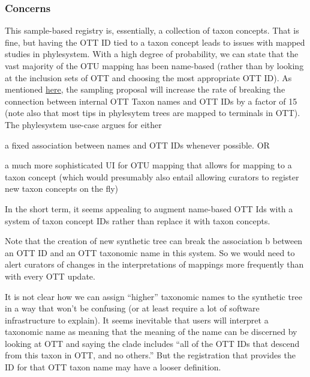 \documentclass[11pt]{article}
\begin{document}
\subsubsection{Concerns}
\begin{compactenum}
  \item This sample-based registry is, essentially, a collection of taxon concepts. That is fine, but having the OTT ID tied to a taxon concept leads to issues
  with mapped studies in phylesystem.
  With a high degree of probability, we can state that the vast majority of the 
  OTU mapping has been name-based (rather than by looking at the inclusion
    sets of OTT and choosing the most appropriate OTT ID).
  As mentioned \href{https://docs.google.com/document/d/1hJHjMckLywnoBuY1xG3I0hP-rsl4l8du3iA8kflEOQE/edit?pli=1#heading=h.aqib3hn3t8nx}{here},
  the sampling proposal will increase the rate of breaking the connection
  between internal OTT Taxon names and OTT IDs by a factor of 15 (note also that
  most tips in phylesytem trees are mapped to terminals in OTT).
  The phylesystem use-case argues for either
  \begin{compactenum}
    \item a fixed association between names and OTT IDs whenever possible. OR
    \item a much more sophisticated UI for OTU mapping that allows for mapping
      to a taxon concept (which would presumably also entail allowing curators to
      register new taxon concepts on the fly)
  \end{compactenum}
  In the short term, it seems appealing to augment name-based OTT Ids with a system of taxon concept IDs rather 
  than replace it with taxon concepts.
  \item Note that the creation of new synthetic tree can break the association b
  between an OTT ID and an OTT taxonomic name in this system.
  So we would need to alert curators of changes in the interpretations of 
  mappings more frequently than with every OTT update.
  \item It is not clear how we can assign ``higher'' taxonomic names to the 
  synthetic tree in a way that won't be confusing (or at least require a lot
  of software infrastructure to explain).
  It seems inevitable that users will interpret a taxonomic name as meaning
  that the meaning of the name can be discerned by looking at OTT and saying
  the clade includes ``all of the OTT IDs that descend from this taxon in OTT, 
  and no others.''
  But the registration that provides the ID for that OTT taxon name may have a
    looser definition.
\end{compactenum}
\end{document}

